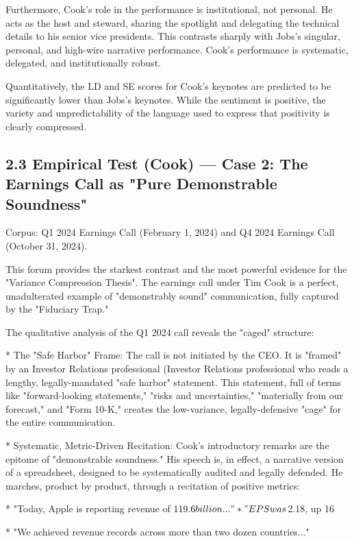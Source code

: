 \documentclass[12pt]{article}
\begin{document}
Furthermore, Cook's role in the performance is institutional, not personal. He acts as the host and steward, sharing the spotlight and delegating the technical details to his senior vice presidents. This contrasts sharply with Jobs's singular, personal, and high-wire narrative performance. Cook's performance is systematic, delegated, and institutionally robust.

Quantitatively, the LD and SE scores for Cook's keynotes are predicted to be significantly lower than Jobs's keynotes. While the sentiment is positive, the variety and unpredictability of the language used to express that positivity is clearly compressed.

\subsection{2.3 Empirical Test (Cook) — Case 2: The Earnings Call as "Pure Demonstrable Soundness"}

Corpus: Q1 2024 Earnings Call (February 1, 2024) and Q4 2024 Earnings Call (October 31, 2024).

This forum provides the starkest contrast and the most powerful evidence for the "Variance Compression Thesis". The earnings call under Tim Cook is a perfect, unadulterated example of "demonstrably sound" communication, fully captured by the "Fiduciary Trap."

The qualitative analysis of the Q1 2024 call reveals the "caged" structure:

* The "Safe Harbor" Frame: The call is not initiated by the CEO. It is "framed" by an Investor Relations professional (Investor Relations professional who reads a lengthy, legally-mandated "safe harbor" statement. This statement, full of terms like "forward-looking statements," "risks and uncertainties," "materially from our forecast," and "Form 10-K," creates the low-variance, legally-defensive "cage" for the entire communication.

* Systematic, Metric-Driven Recitation: Cook's introductory remarks are the epitome of "demonstrable soundness." His speech is, in effect, a narrative version of a spreadsheet, designed to be systematically audited and legally defended. He marches, product by product, through a recitation of positive metrics:

  * "Today, Apple is reporting revenue of $119.6 billion..."

  * "EPS was $2.18, up 16%

  * "We achieved revenue records across more than two dozen countries..."
\end{document}
